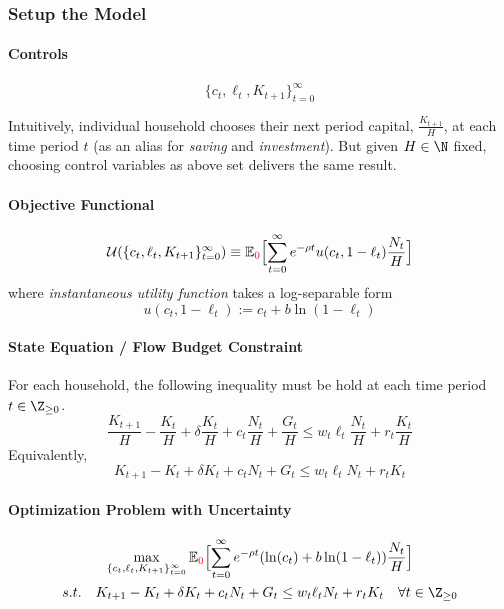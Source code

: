 \documentclass[11pt]{article}
\newcommand{\expat}[2]{\mathbb{E}_{#1}\Big[{#2}\Big]}
\begin{document}
			
			\setcounter{equation}{0}
			\subsubsection{Setup the Model}
				\paragraph{Controls}
					\begin{equation}
						\{c_t, \ell_t, K_{t+1}\}_{t=0}^\infty
					\end{equation}
				\begin{remark}
					Intuitively, individual household chooses their next period capital, $\frac{K_{t+1}}{H}$, at each time period $t$ (as an alias for \emph{saving} and \emph{investment}). But given $H \in \N$ fixed, choosing control variables as above set delivers the same result. 
				\end{remark}
				\paragraph{Objective Functional}
					\begin{equation}
						\mc{U}(\{c_t, \ell_t, K_{t+1}\}_{t=0}^\infty) \equiv \expat{\textcolor{red}{0}}{\sum_{t=0}^\infty {e^{-\rho t} u(c_t, 1-\ell_t) \frac{N_t}{H}}}
					\end{equation}
					where \emph{instantaneous utility function} takes a log-separable form
					\begin{equation}
						u(c_t, 1-\ell_t) := c_t + b \ln(1-\ell_t)
					\end{equation}
				\paragraph{State Equation / Flow Budget Constraint} For each household, the following inequality must be hold at each time period $t \in \Z_{\geq 0}$.
					\begin{equation}
						\frac{K_{t+1}}{H} - \frac{K_t}{H} + \delta \frac{K_t}{H} + c_t \frac{N_t}{H} + \frac{G_t}{H} \leq w_t \ell_t \frac{N_t}{H} + r_t \frac{K_t}{H}
					\end{equation}
					Equivalently,
					\begin{equation}
						K_{t+1} - K_t + \delta K_t + c_t N_t + G_t \leq w_t \ell_t N_t + r_t K_t
					\end{equation}
				\paragraph{Optimization Problem with Uncertainty}
					\begin{gather}
						\max_{\{c_t, \ell_t, K_{t+1}\}_{t=0}^\infty} \expat{\textcolor{red}{0}}{\sum_{t=0}^\infty {e^{-\rho t} (\ln(c_t) + b \ln(1-\ell_t)) \frac{N_t}{H}}} \\
						s.t.\quad K_{t+1} - K_t + \delta K_t + c_t N_t + G_t \leq w_t \ell_t N_t + r_t K_t \quad \forall t \in \Z_{\geq 0}
					\end{gather}
				
\end{document}
